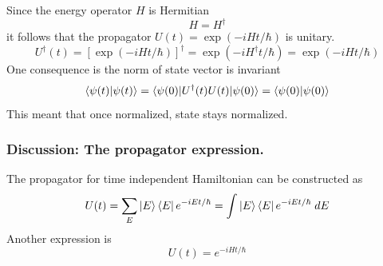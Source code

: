 \documentclass[../../../main.tex]{subfiles}
\begin{document}
Since the energy operator $H$ is Hermitian
\begin{equation*}
    H=H ^\dagger
\end{equation*}
it follows that the propagator $U(t)=\exp(-i Ht/\hbar)$ is unitary.
\begin{equation*}
    U ^\dagger(t)=\left[\exp(-i Ht/\hbar)\right]^\dagger=\exp(-i H ^\dagger t/\hbar)=\exp(-i Ht/\hbar)
\end{equation*}
One consequence is the norm of state vector is invariant
\begin{equation*}
    \braket{\psi(t)|\psi(t)}=\braket{\psi(0)|U ^\dagger(t)U(t)|\psi(0)}=\braket{\psi(0)|\psi(0)}
\end{equation*}
This meant that once normalized, state stays normalized.

\subsubsection{Discussion: The propagator expression.}
The propagator for time independent Hamiltonian can be constructed as
\begin{equation*}
    U(t)=\sum_E \ket{E } \bra{E }e^{-iEt/\hbar}=\int \ket{E} \bra{E}e^{-iEt/\hbar}\;dE
\end{equation*}
Another expression is
\begin{equation*}
    U(t)=e^{-iHt/\hbar}
\end{equation*}
\end{document}
